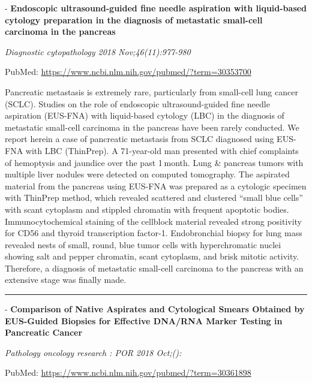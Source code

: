 \documentclass[]{article}
\begin{document}
 - \textbf{Endoscopic ultrasound-guided fine needle aspiration with
liquid-based cytology preparation in the diagnosis of metastatic
small-cell carcinoma in the pancreas}

\emph{Diagnostic cytopathology 2018 Nov;46(11):977-980}

PubMed: \url{https://www.ncbi.nlm.nih.gov/pubmed/?term=30353700}

Pancreatic metastasis is extremely rare, particularly from small-cell
lung cancer (SCLC). Studies on the role of endoscopic ultrasound-guided
fine needle aspiration (EUS-FNA) with liquid-based cytology (LBC) in the
diagnosis of metastatic small-cell carcinoma in the pancreas have been
rarely conducted. We report herein a case of pancreatic metastasis from
SCLC diagnosed using EUS-FNA with LBC (ThinPrep). A 71-year-old man
presented with chief complaints of hemoptysis and jaundice over the past
1 month. Lung \& pancreas tumors with multiple liver nodules were
detected on computed tomography. The aspirated material from the
pancreas using EUS-FNA was prepared as a cytologic specimen with
ThinPrep method, which revealed scattered and clustered ``small blue
cells'' with scant cytoplasm and stippled chromatin with frequent
apoptotic bodies. Immunocytochemical staining of the cellblock material
revealed strong positivity for CD56 and thyroid transcription factor-1.
Endobronchial biopsy for lung mass revealed nests of small, round, blue
tumor cells with hyperchromatic nuclei showing salt and pepper
chromatin, scant cytoplasm, and brisk mitotic activity. Therefore, a
diagnosis of metastatic small-cell carcinoma to the pancreas with an
extensive stage was finally made.

{}

{}

\begin{center}\rule{0.5\linewidth}{\linethickness}\end{center}

 - \textbf{Comparison of Native Aspirates and Cytological Smears
Obtained by EUS-Guided Biopsies for Effective DNA/RNA Marker Testing in
Pancreatic Cancer}

\emph{Pathology oncology research : POR 2018 Oct;():}

PubMed: \url{https://www.ncbi.nlm.nih.gov/pubmed/?term=30361898}
\end{document}
